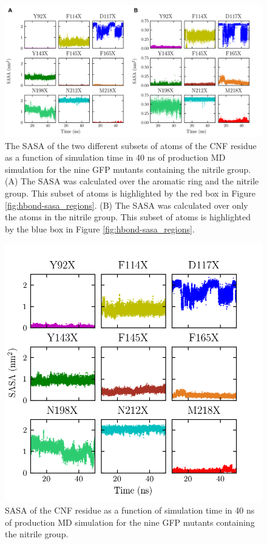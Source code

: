 \begin{figure}
    \center
    \includegraphics[width=\double]{figures-gfp-hbond/FigureS1_combined.png}
    \caption{
        The SASA of the two different subsets of atoms of the CNF residue as a function of simulation time in 40 ns of production MD simulation for the nine GFP mutants containing the nitrile group. 
        (A) The SASA was calculated over the aromatic ring and the nitrile group. 
        This subset of atoms is highlighted by the red box in Figure \ref{fig:hbond-sasa_regions}. 
        (B) The SASA was calculated over only the atoms in the nitrile group. 
        This subset of atoms is highlighted by the blue box in Figure \ref{fig:hbond-sasa_regions}.
    }
    \label{fig:hbond-sasa_regions_v_time}
\end{figure}

\begin{figure}
    \center
    \includegraphics[width=\single]{figures-gfp-hbond/sasa_v_time.png}
    \caption{
        SASA of the CNF residue as a function of simulation time in 40 ns of production MD simulation for the nine GFP mutants containing the nitrile group.
    }
    \label{fig:hbond-sasa}
\end{figure}

